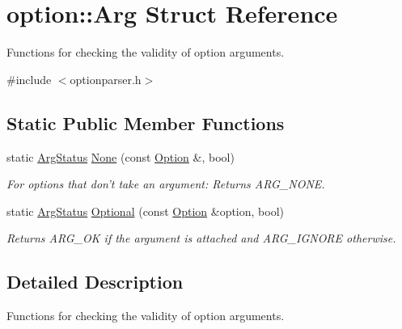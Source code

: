 \hypertarget{structoption_1_1_arg}{\section{option\-:\-:\-Arg \-Struct \-Reference}
\label{structoption_1_1_arg}
}


\-Functions for checking the validity of option arguments.  




{\ttfamily \#include $<$optionparser.\-h$>$}

\subsection*{\-Static \-Public \-Member \-Functions}
\begin{DoxyCompactItemize}
\item 
\hypertarget{structoption_1_1_arg_a7fc01987899c91c6b6a1be5711a46e22}{static \hyperlink{namespaceoption_aee8c76a07877335762631491e7a5a1a9}{\-Arg\-Status} \hyperlink{structoption_1_1_arg_a7fc01987899c91c6b6a1be5711a46e22}{\-None} (const \hyperlink{classoption_1_1_option}{\-Option} \&, bool)}\label{structoption_1_1_arg_a7fc01987899c91c6b6a1be5711a46e22}

\begin{DoxyCompactList}\small\item\em \-For options that don't take an argument\-: \-Returns \-A\-R\-G\-\_\-\-N\-O\-N\-E. \end{DoxyCompactList}\item 
\hypertarget{structoption_1_1_arg_aadb5316ecbc9eb0a7f0019d14bf35ad0}{static \hyperlink{namespaceoption_aee8c76a07877335762631491e7a5a1a9}{\-Arg\-Status} \hyperlink{structoption_1_1_arg_aadb5316ecbc9eb0a7f0019d14bf35ad0}{\-Optional} (const \hyperlink{classoption_1_1_option}{\-Option} \&option, bool)}\label{structoption_1_1_arg_aadb5316ecbc9eb0a7f0019d14bf35ad0}

\begin{DoxyCompactList}\small\item\em \-Returns \-A\-R\-G\-\_\-\-O\-K if the argument is attached and \-A\-R\-G\-\_\-\-I\-G\-N\-O\-R\-E otherwise. \end{DoxyCompactList}\end{DoxyCompactItemize}


\subsection{\-Detailed \-Description}
\-Functions for checking the validity of option arguments. 

